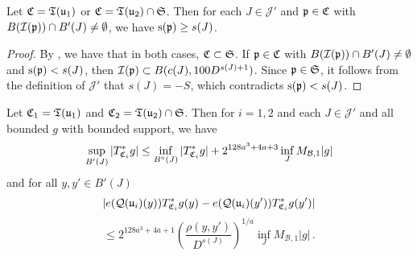     \begin{lemma}
        \label{scales-impacting-interval}
        \leanok
        Let ${\mathfrak C} = {\mathfrak T}({\mathfrak u}_1)$ or ${\mathfrak C} = {\mathfrak T}({\mathfrak u}_2) \cap \mathfrak{S}$. Then for each $J \in \mathcal{J}'$ and ${\mathfrak p} \in {\mathfrak C}$ with $B({\mathcal{I}}({\mathfrak p})) \cap B'(J) \neq \emptyset$, we have ${\mathrm{s}}({\mathfrak p}) \ge s(J)$.
    \end{lemma}

    \begin{proof}
        \leanok
        By , we have that in both cases, ${\mathfrak C} \subset \mathfrak{S}$. If ${\mathfrak p} \in {\mathfrak C}$ with $B({\mathcal{I}}({\mathfrak p})) \cap B'(J) \neq \emptyset$ and ${\mathrm{s}}({\mathfrak p}) < s(J)$, then ${\mathcal{I}}({\mathfrak p}) \subset B(c(J), 100 D^{s(J) + 1})$. Since ${\mathfrak p} \in \mathfrak{S}$, it follows from the definition of $\mathcal{J}'$ that $s(J) = -S$, which contradicts ${\mathrm{s}}({\mathfrak p}) < s(J)$.
    \end{proof}

    \begin{lemma}
        \label{global-tree-control-1}
        \leanok
        Let ${\mathfrak C}_1 = {\mathfrak T}({\mathfrak u}_1)$ and ${\mathfrak C}_2 = {\mathfrak T}({\mathfrak u}_2) \cap \mathfrak{S}$. Then for $i = 1,2$ and each $J \in \mathcal{J}'$ and all bounded $g$ with bounded support, we have
        \begin{align}
            \label{TreeUB}
            \sup_{B'(J)} |T_{{\mathfrak C}_i}^*g| \leq \inf_{B^\circ{}(J)} |T^*_{{\mathfrak C}_i} g| + 2^{128a^3+4a+3} \inf_{J} M_{\mathcal{B}, 1} |g|
        \end{align}
        and for all $y,y' \in B'(J)$
        $$
            |e({\mathcal{Q}}({\mathfrak u}_i)(y)) T_{{\mathfrak C}_i}^* g(y) - e({\mathcal{Q}}({\mathfrak u}_i)(y')) T_{{\mathfrak C}_i}^* g(y')|
        $$
        \begin{equation}
            \label{TreeHolder}
             \le 2^{128a^3+4a+1} \left(\frac{\rho(y,y')}{D^{s(J)}}\right)^{1/a} \inf_J M_{\mathcal{B},1} |g|\,.
        \end{equation}
    \end{lemma}

